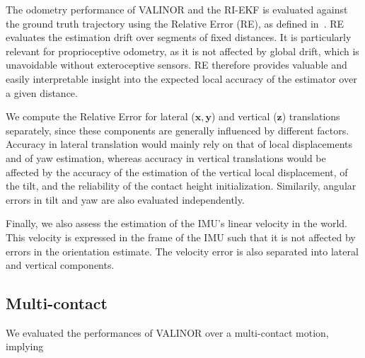 \documentclass{IJCAS}
\begin{document}
The odometry performance of VALINOR and the RI-EKF is evaluated against the ground truth trajectory using the Relative Error (RE), as defined in~\cite{Zhang2018QuantitativeTrajectoryEvaluation}. RE evaluates the estimation drift over segments of fixed distances. It is particularly relevant for proprioceptive odometry, as it is not affected by global drift, which is unavoidable without exteroceptive sensors. RE therefore provides valuable and easily interpretable insight into the expected local accuracy of the estimator over a given distance.

We compute the Relative Error for lateral ($\boldsymbol{x}, \boldsymbol{y}$) and vertical ($\boldsymbol{z}$) translations separately, since these components are generally influenced by different factors. Accuracy in lateral translation would mainly rely on that of local displacements and of yaw estimation, whereas accuracy in vertical translations would be affected by the accuracy of the estimation of the vertical local displacement, of the tilt, and the reliability of the contact height initialization. Similarily, angular errors in tilt and yaw are also evaluated independently.

Finally, we also assess the estimation of the IMU's linear velocity in the world. This velocity is expressed in the frame of the IMU such that it is not affected by errors in the orientation estimate. The velocity error is also separated into lateral and vertical components.

\subsection{Multi-contact}

We evaluated the performances of VALINOR over a multi-contact motion, implying 
\end{document}
